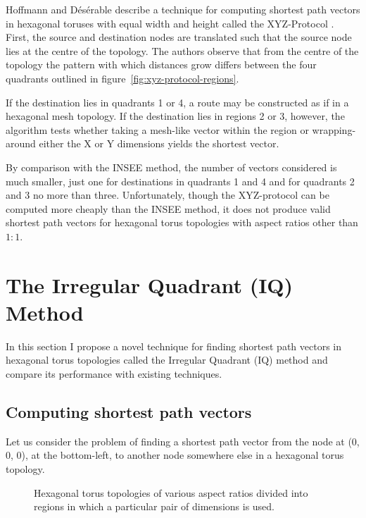				Hoffmann and D\'es\'erable describe a technique for computing shortest
				path vectors in hexagonal toruses with equal width and height called
				the XYZ-Protocol \cite{hoffmann15,hoffmann11}. First, the source and
				destination nodes are translated such that the source node lies at the
				centre of the topology. The authors observe that from the centre of the
				topology the pattern with which distances grow differs between the four
				quadrants outlined in figure~\ref{fig:xyz-protocol-regions}.
				
				If the destination lies in quadrants 1 or 4, a route may be constructed
				as if in a hexagonal mesh topology. If the destination lies in regions
				2 or 3, however, the algorithm tests whether taking a mesh-like vector
				within the region or wrapping-around either the X or Y dimensions
				yields the shortest vector.
				
				By comparison with the INSEE method, the number of vectors considered
				is much smaller, just one for destinations in quadrants 1 and 4 and for
				quadrants 2 and 3 no more than three. Unfortunately, though the
				XYZ-protocol can be computed more cheaply than the INSEE method, it
				does not produce valid shortest path vectors for hexagonal torus
				topologies with aspect ratios other than $1:1$.
		
	\section{The Irregular Quadrant (IQ) Method}
		
		In this section I propose a novel technique for finding shortest path
		vectors in hexagonal torus topologies called the Irregular Quadrant (IQ)
		method and compare its performance with existing techniques.
		
		\subsection{Computing shortest path vectors}
		
			Let us consider the problem of finding a shortest path vector from the node
			at (0, 0, 0), at the bottom-left, to another node somewhere else in a
			hexagonal torus topology.
			
			\begin{figure}
				\center
				
				\caption{Hexagonal torus topologies of various aspect ratios divided
				into regions in which a particular pair of dimensions is used.}
				\label{fig:shortest-path-regions}
			\end{figure}
			
